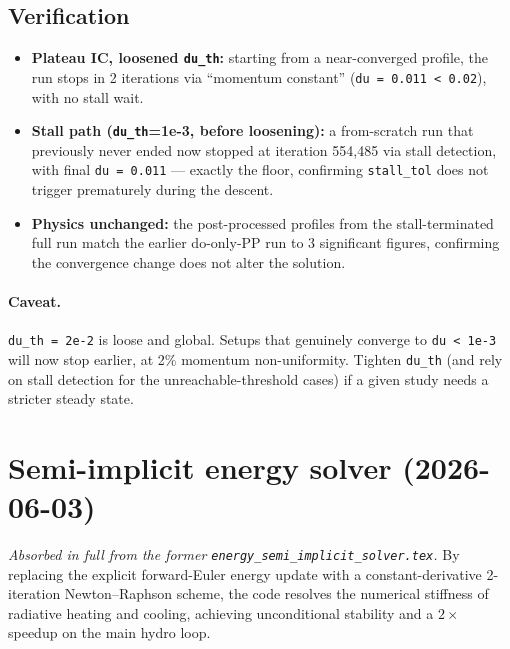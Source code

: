 \documentclass[english,a4paper]{kiseon_memo}
\begin{document}
\subsection{Verification}
\begin{itemize}
\item \textbf{Plateau IC, loosened \texttt{du\_th}:} starting from a near-converged
  profile, the run stops in 2 iterations via ``momentum constant''
  (\verb|du = 0.011 < 0.02|), with no stall wait.
\item \textbf{Stall path (\texttt{du\_th}=1e-3, before loosening):} a from-scratch
  run that previously never ended now stopped at iteration 554{,}485 via stall
  detection, with final \verb|du = 0.011| --- exactly the floor, confirming
  \verb|stall_tol| does not trigger prematurely during the descent.
\item \textbf{Physics unchanged:} the post-processed profiles from the
  stall-terminated full run match the earlier do-only-PP run to 3 significant
  figures, confirming the convergence change does not alter the solution.
\end{itemize}

\paragraph{Caveat.} \verb|du_th = 2e-2| is loose and global. Setups that genuinely
converge to \verb|du < 1e-3| will now stop earlier, at 2\% momentum non-uniformity.
Tighten \verb|du_th| (and rely on stall detection for the unreachable-threshold
cases) if a given study needs a stricter steady state.

\section{Semi-implicit energy solver (2026-06-03)}\label{sec:semi}
\emph{Absorbed in full from the former \texttt{energy\_semi\_implicit\_solver.tex}.}
By replacing the explicit forward-Euler energy update with a constant-derivative
2-iteration Newton--Raphson scheme, the code resolves the numerical stiffness of
radiative heating and cooling, achieving unconditional stability and a $2\times$
speedup on the main hydro loop.
\end{document}
